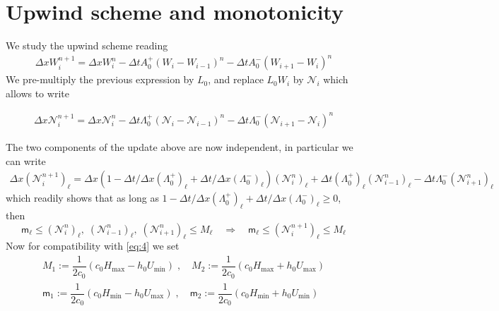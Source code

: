 \documentclass[10pt]{article}
\begin{document}
 \section{Upwind scheme and monotonicity}
 
 We study the upwind scheme reading
 \begin{equation}\label{eq:8}
\begin{split}
\Delta xW_i^{n+1} =\Delta x W_i^n - \Delta t    A_0^+(W_i -W_{i-1} )^n
- \Delta t    A_0^-(W_{i+1} -W_{i} )^n
 \end{split}
\end{equation}
We pre-multiply the previous expression by $L_0$, and replace $L_0W_i$ by $\mathcal{N}_i$ which allows to write

 \begin{equation}\label{eq:9}
\begin{split}
\Delta x\mathcal{N}_i^{n+1} =\Delta x \mathcal{N}_i^n - \Delta t    \Lambda_0^+(\mathcal{N}_i -\mathcal{N}_{i-1} )^n
- \Delta t    \Lambda_0^-(\mathcal{N}_{i+1} -\mathcal{N}_{i} )^n
 \end{split}
\end{equation}

The two components of the  update above are now   independent, in particular we can write
 \begin{equation}\label{eq:10}
\begin{split}
\Delta x(\mathcal{N}_i^{n+1})_{\ell} =\Delta x (   1 - \Delta t /\Delta x (\Lambda_0^+)_{\ell} +\Delta t /\Delta x (\Lambda_0^-)_{\ell} )
(\mathcal{N}_i^n)_{\ell} + \Delta t   ( \Lambda_0^+)_{\ell}(\mathcal{N}_{i-1}^n )_{\ell}
- \Delta t    \Lambda_0^-(\mathcal{N}_{i+1}^n )_{\ell}
 \end{split}
\end{equation}
which readily shows that  as long as $1 - \Delta t/\Delta x  (\Lambda_0^+)_{\ell} +\Delta t /\Delta x (\Lambda_0^-)_{\ell}  \ge 0$, then
 \begin{equation}\label{eq:11}
\textsf{m}_{\ell} \le (\mathcal{N}_i^n)_{\ell},\;(\mathcal{N}_{i-1}^n)_{\ell},\; (\mathcal{N}_{i+1}^n)_{\ell} \le M_{\ell}
\quad\Rightarrow\quad
\textsf{m}_{\ell} \le(\mathcal{N}_i^{n+1})_{\ell} \le M_{\ell}
\end{equation}
Now for compatibility with \eqref{eq:4} we set
 \begin{equation}\label{eq:12}\begin{split}
 M_1 :=  \dfrac{1}{2c_0}(c_0 H_{\max} - h_0 U_{\min})\;,\quad
  M_2 := \dfrac{1}{2c_0}(c_0 H_{\max} + h_0 U_{\max}) \\
  \textsf{m}_1:=  \dfrac{1}{2c_0}(c_0 H_{\min} - h_0 U_{\max})\;,\quad
  \textsf{m}_2:=\dfrac{1}{2c_0}(c_0 H_{\min} + h_0 U_{\min})
\end{split}\end{equation}
\end{document}

